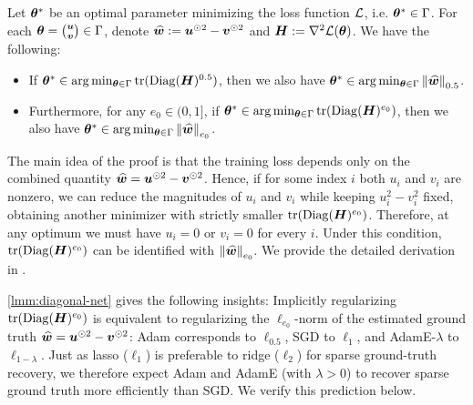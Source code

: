 \begin{lemma}\label{lmm:diagonal-net}
Let ${\bm{\theta}}^*$ be an optimal parameter minimizing the loss function $\mathcal{L}$, i.e. ${\bm{\theta}}^* \in \Gamma$. For each ${\bm{\theta}} = \tbinom{{\bm{u}}}{{\bm{v}}} \in \Gamma$, denote $\widehat{{\bm{w}}} := {\bm{u}}^{\odot 2} - {\bm{v}}^{\odot 2}$ and ${\bm{H}} := \nabla^2 \mathcal{L}({\bm{\theta}})$. We have the following: 
\begin{itemize}
    \item If ${\bm{\theta}}^* \in \arg\min_{{\bm{\theta}} \in \Gamma} \text{tr}(\mathrm{Diag}({\bm{H}})^{0.5})$, then we also have ${\bm{\theta}}^* \in \arg\min_{{\bm{\theta}} \in \Gamma} \left\| \widehat{{\bm{w}}} \right\|_{0.5}$.
    \item Furthermore, for any $e_0 \in (0, 1]$, if ${\bm{\theta}}^* \in \arg\min_{{\bm{\theta}} \in \Gamma} \text{tr}(\mathrm{Diag}({\bm{H}})^{e_0})$, then we also have ${\bm{\theta}}^* \in \arg\min_{{\bm{\theta}} \in \Gamma} \left\|\widehat{{\bm{w}}} \right\|_{e_0}$.
\end{itemize} 
\end{lemma}

The main idea of the proof is that the training loss depends only on the combined quantity $\widehat{{\bm{w}}} = {\bm{u}}^{\odot 2} - {\bm{v}}^{\odot 2}$. Hence, if for some index $i$ both $u_i$ and $v_i$ are nonzero, we can reduce the magnitudes of $u_i$ and $v_i$ while keeping $u_i^2-v_i^2$ fixed, obtaining another minimizer with strictly smaller $\text{tr}(\mathrm{Diag}({\bm{H}})^{e_0})$. Therefore, at any optimum we must have \(u_i=0\) or \(v_i=0\) for every \(i\). Under this condition, $\text{tr}(\mathrm{Diag}({\bm{H}})^{e_0})$ can be  identified with $\left\|\widehat{{\bm{w}}} \right\|_{e_0}$. We provide the detailed derivation in . %


\cref{lmm:diagonal-net} gives the following insights: Implicitly regularizing $\text{tr}(\mathrm{Diag}({\bm{H}})^{e_0})$ is equivalent to regularizing the \(\ell_{e_0}\)-norm of the estimated ground truth $\widehat{{\bm{w}}} = {\bm{u}}^{\odot 2} - {\bm{v}}^{\odot 2}$: Adam corresponds to \(\ell_{0.5}\), SGD to \(\ell_1\), and AdamE-\(\lambda\) to \(\ell_{1-\lambda}\). Just as lasso (\(\ell_1\)) is preferable to ridge (\(\ell_2\)) for sparse ground-truth recovery, we therefore expect Adam and AdamE (with $\lambda > 0$) to recover sparse ground truth more efficiently than SGD. We verify this prediction below.
